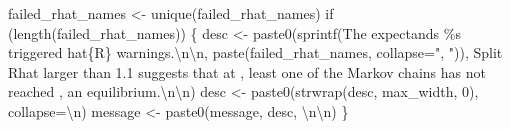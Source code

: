 \documentclass[
  letterpaper,
  DIV=11,
  numbers=noendperiod]{scrartcl}
\newenvironment{Shaded}{\begin{snugshade}}{\end{snugshade}}
\newcommand{\AttributeTok}[1]{\textcolor[rgb]{0.40,0.45,0.13}{#1}}
\newcommand{\ControlFlowTok}[1]{\textcolor[rgb]{0.00,0.23,0.31}{#1}}
\newcommand{\DecValTok}[1]{\textcolor[rgb]{0.68,0.00,0.00}{#1}}
\newcommand{\FunctionTok}[1]{\textcolor[rgb]{0.28,0.35,0.67}{#1}}
\newcommand{\NormalTok}[1]{\textcolor[rgb]{0.00,0.23,0.31}{#1}}
\newcommand{\OtherTok}[1]{\textcolor[rgb]{0.00,0.23,0.31}{#1}}
\newcommand{\SpecialCharTok}[1]{\textcolor[rgb]{0.37,0.37,0.37}{#1}}
\newcommand{\StringTok}[1]{\textcolor[rgb]{0.13,0.47,0.30}{#1}}
\begin{document}
\begin{Shaded}
\begin{Highlighting}[]
\NormalTok{  failed\_rhat\_names }\OtherTok{\textless{}{-}} \FunctionTok{unique}\NormalTok{(failed\_rhat\_names)}
  \ControlFlowTok{if}\NormalTok{ (}\FunctionTok{length}\NormalTok{(failed\_rhat\_names)) \{}
\NormalTok{    desc }\OtherTok{\textless{}{-}} 
      \FunctionTok{paste0}\NormalTok{(}\FunctionTok{sprintf}\NormalTok{(}\StringTok{\textquotesingle{}The expectands \%s triggered hat\{R\} warnings.}\SpecialCharTok{\textbackslash{}n\textbackslash{}n}\StringTok{\textquotesingle{}}\NormalTok{,}
             \FunctionTok{paste}\NormalTok{(failed\_rhat\_names, }\AttributeTok{collapse=}\StringTok{", "}\NormalTok{)),}
             \StringTok{\textquotesingle{}  Split Rhat larger than 1.1 suggests that at \textquotesingle{}}\NormalTok{,}
             \StringTok{\textquotesingle{}least one of the Markov chains has not reached \textquotesingle{}}\NormalTok{,}
             \StringTok{\textquotesingle{}an equilibrium.}\SpecialCharTok{\textbackslash{}n\textbackslash{}n}\StringTok{\textquotesingle{}}\NormalTok{)}
\NormalTok{    desc }\OtherTok{\textless{}{-}} \FunctionTok{paste0}\NormalTok{(}\FunctionTok{strwrap}\NormalTok{(desc, max\_width, }\DecValTok{0}\NormalTok{), }\AttributeTok{collapse=}\StringTok{\textquotesingle{}}\SpecialCharTok{\textbackslash{}n}\StringTok{\textquotesingle{}}\NormalTok{)}
\NormalTok{    message }\OtherTok{\textless{}{-}} \FunctionTok{paste0}\NormalTok{(message, desc, }\StringTok{\textquotesingle{}}\SpecialCharTok{\textbackslash{}n\textbackslash{}n}\StringTok{\textquotesingle{}}\NormalTok{)}
\NormalTok{  \}}
  

\end{Highlighting}
\end{Shaded}
\end{document}
